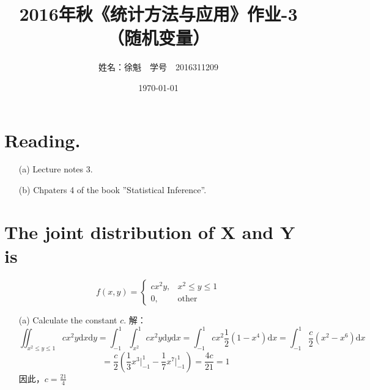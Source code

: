 \documentclass [12pt]{article}
\begin{document}
 \begin{CJK*}{GBK}{kai}
\newtheorem{theorem}{定理}
\newtheorem{definition}{定义}
\newtheorem{lemma}{引理}
\newtheorem{corollary}{推论}
\newtheorem{proposition}{性质}
\newtheorem{example}{例}
\newtheorem{remark}{注}
    \title{2016年秋《统计方法与应用》作业-3（随机变量）}
    \author{ 姓名：徐魁\,\,\,\, 学号~~{2016311209}}
    \date{\today}
\maketitle

\section{Reading. }
\begin{enumerate}
  \item[(a)] Lecture notes 3.
 \item[(b)] Chpaters 4 of the book ”Statistical Inference”.\\
 
\end{enumerate}

\section{The joint distribution of X and Y is}
$$f(x,y)=\begin{cases}
	cx^2y, & \text{$x^2 \le y \le 1$}\\
	0, & \text{other}
\end{cases}$$
\begin{enumerate}
  \item[(a)]  Calculate the constant $c$.
  解：$$\iint_{x^2 \le y \le 1} cx^2y\mathrm{d}x\mathrm{d}y
  =\int_{-1}^{1}\int_{x^2}^{1}cx^2y\mathrm{d}y\mathrm{d}x
  =\int_{-1}^{1}cx^2\frac{1}{2}(1-x^4)\mathrm{d}x
  =\int_{-1}^{1}\frac{c}{2}(x^2-x^6)\mathrm{d}x
  $$
  $$
  =\frac{c}{2}(\frac{1}{3}x^3 \vert_{-1}^{1}-\frac{1}{7}x^7 \vert_{-1}^{1})
  =\frac{4c}{21}=1
  $$
  因此，$c=\frac{21}{4}$
  

\end{enumerate}
\end{CJK*}
\end{document}
